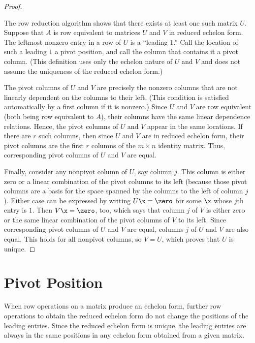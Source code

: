 \begin{proof}
  \label{prf:uniqueness_of_the_reduced_echelon_form}

  The row reduction algorithm shows that there exists at least one such matrix
  $U$. Suppose that $A$ is row equivalent to matrices $U$ and $V$ in reduced
  echelon form. The leftmost nonzero entry in a row of $U$ is a ``leading $1$.''
  Call the location of such a leading $1$ a pivot position, and call the column
  that contains it a pivot column. (This definition uses only the echelon nature
  of $U$ and $V$ and does not assume the uniqueness of the reduced echelon
  form.)

  The pivot columns of $U$ and $V$ are precisely the nonzero columns that are
  not linearly dependent on the columns to their left. (This condition is
  satisfied automatically by a first column if it is nonzero.) Since $U$ and $V$
  are row equivalent (both being row equivalent to $A$), their columns have the
  same linear dependence relations. Hence, the pivot columns of $U$ and $V$
  appear in the same locations. If there are $r$ such columns, then since $U$
  and $V$ are in reduced echelon form, their pivot columns are the first $r$
  columns of the $m \times n$ identity matrix. Thus, corresponding pivot columns
  of $U$ and $V$ are equal.

  Finally, consider any nonpivot column of $U$, say column $j$. This column is
  either zero or a linear combination of the pivot columns to its left (because
  those pivot columns are a basis for the space spanned by the columns to the
  left of column $j$). Either case can be expressed by writing $U\x = \zero$ for
  some $\x$ whose $j$th entry is $1$. Then $V\x = \zero$, too, which says that
  column $j$ of $V$ is either zero or the same linear combination of the pivot
  columns of $V$ to its left. Since corresponding pivot columns of $U$ and $V$
  are equal, columns $j$ of $U$ and $V$ are also equal. This holds for all
  nonpivot columns, so $V = U$, which proves that $U$ is unique.
\end{proof}

\section{Pivot Position}
\label{sec:pivot_position}

When row operations on a matrix produce an echelon form, further row operations
to obtain the reduced echelon form do not change the positions of the leading
entries. Since the reduced echelon form is unique, the leading entries are
always in the same positions in any echelon form obtained from a given matrix.

